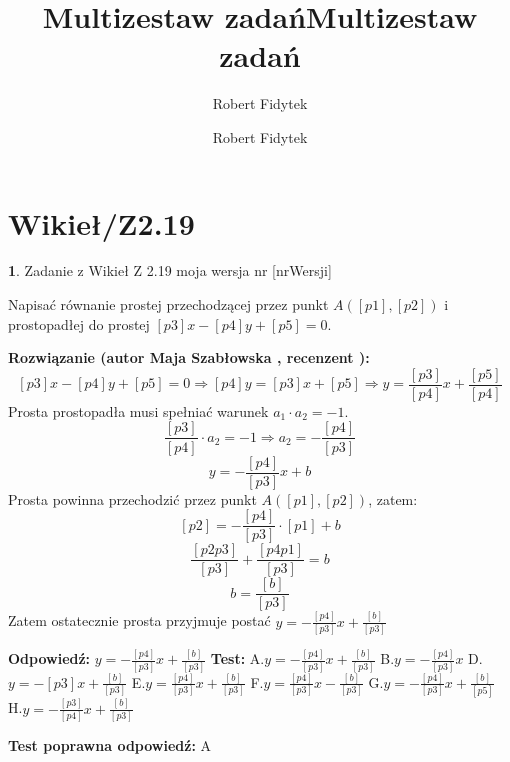 \documentclass[12pt, a4paper]{article}
\title{Multizestaw zadań}
\author{Robert Fidytek}
\date{}\documentclass[12pt, a4paper]{article}
\title{Multizestaw zadań}
\author{Robert Fidytek}
\date{}
\theoremstyle{definition} %
\newtheorem{zad}{}
\theoremstyle{definition} %
\newtheorem{zad}{}
\newcommand{\kategoria}[1]{\section{#1}} %
\newcommand{\zadStart}[1]{\begin{zad}#1\newline} %
\newcommand{\zadStop}{\end{zad}}   %
\newcommand{\rozwStart}[2]{\noindent \textbf{Rozwiązanie (autor #1 , recenzent #2): }\newline} %
\newcommand{\rozwStop}{\newline}                                            %
\newcommand{\odpStart}{\noindent \textbf{Odpowiedź:}\newline}    %
\newcommand{\odpStop}{\newline}                                             %
\newcommand{\testStart}{\noindent \textbf{Test:}\newline} %
\newcommand{\testStop}{\newline} %
\newcommand{\kluczStart}{\noindent \textbf{Test poprawna odpowiedź:}\newline} %
\newcommand{\kluczStop}{\newline} %
\begin{document}
\maketitle


\kategoria{Wikieł/Z2.19}
\zadStart{Zadanie z Wikieł Z 2.19  moja wersja nr [nrWersji]}

Napisać równanie prostej przechodzącej przez punkt $A([p1],[p2])$ i prostopadłej do prostej $[p3]x-[p4]y+[p5]=0.$
\zadStop

\rozwStart{Maja Szabłowska}{}
$$[p3]x-[p4]y+[p5]=0 \Rightarrow [p4]y=[p3]x+[p5] \Rightarrow y=\frac{[p3]}{[p4]}x+\frac{[p5]}{[p4]}$$
Prosta prostopadła musi spełniać warunek $a_{1}\cdot a_{2}=-1.$
$$\frac{[p3]}{[p4]}\cdot a_{2}=-1 \Rightarrow a_{2}=-\frac{[p4]}{[p3]}$$
 $$y=-\frac{[p4]}{[p3]}x+b$$
 Prosta powinna przechodzić przez punkt $A([p1],[p2])$, zatem:
 $$[p2]=-\frac{[p4]}{[p3]}\cdot [p1] +b$$
 $$\frac{[p2p3]}{[p3]}+\frac{[p4p1]}{[p3]}=b$$
 $$b=\frac{[b]}{[p3]}$$
 Zatem ostatecznie prosta przyjmuje postać $y=-\frac{[p4]}{[p3]}x+\frac{[b]}{[p3]}$

\rozwStop


\odpStart
$y=-\frac{[p4]}{[p3]}x+\frac{[b]}{[p3]}$
\odpStop
\testStart
A.$y=-\frac{[p4]}{[p3]}x+\frac{[b]}{[p3]}$
B.$y=-\frac{[p4]}{[p3]}x$
D.$y=-[p3]x+\frac{[b]}{[p3]}$
E.$y=\frac{[p4]}{[p3]}x+\frac{[b]}{[p3]}$
F.$y=\frac{[p4]}{[p3]}x-\frac{[b]}{[p3]}$
G.$y=-\frac{[p4]}{[p3]}x+\frac{[b]}{[p5]}$
H.$y=-\frac{[p3]}{[p4]}x+\frac{[b]}{[p3]}$

\testStop
\kluczStart
A
\kluczStop
\end{document}
